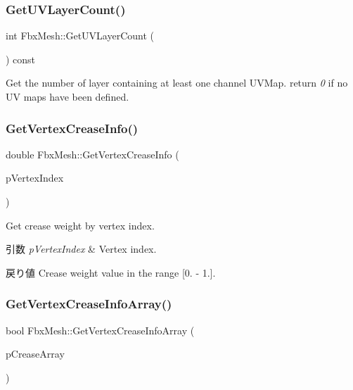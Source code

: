 \subsubsection{\texorpdfstring{Get\+U\+V\+Layer\+Count()}{GetUVLayerCount()}}
{\footnotesize\ttfamily int Fbx\+Mesh\+::\+Get\+U\+V\+Layer\+Count (\begin{DoxyParamCaption}{ }\end{DoxyParamCaption}) const}

Get the number of layer containing at least one channel U\+V\+Map. return {\itshape 0} if no UV maps have been defined. \mbox{\label{class_fbx_mesh_a9c74158d50e75f30e82715fde2eca434}} 
\subsubsection{\texorpdfstring{Get\+Vertex\+Crease\+Info()}{GetVertexCreaseInfo()}}
{\footnotesize\ttfamily double Fbx\+Mesh\+::\+Get\+Vertex\+Crease\+Info (\begin{DoxyParamCaption}\item[{int}]{p\+Vertex\+Index }\end{DoxyParamCaption})}

Get crease weight by vertex index. 
\begin{DoxyParams}{引数}
{\em p\+Vertex\+Index} & Vertex index. \\
\hline
\end{DoxyParams}
\begin{DoxyReturn}{戻り値}
Crease weight value in the range \mbox{[}0. -\/ 1.\mbox{]}. 
\end{DoxyReturn}
\mbox{\label{class_fbx_mesh_a4c62415bddc677a16c9794189b23eeba}} 
\subsubsection{\texorpdfstring{Get\+Vertex\+Crease\+Info\+Array()}{GetVertexCreaseInfoArray()}}
{\footnotesize\ttfamily bool Fbx\+Mesh\+::\+Get\+Vertex\+Crease\+Info\+Array (\begin{DoxyParamCaption}\item[{\hyperlink{class_fbx_layer_element_array_template}{Fbx\+Layer\+Element\+Array\+Template}$<$ double $>$ $\ast$$\ast$}]{p\+Crease\+Array }\end{DoxyParamCaption})}

